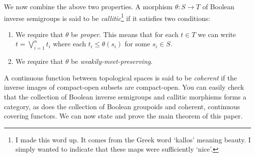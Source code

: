 \documentclass[a4paper]{amsart}
\begin{document}
We now combine the above two properties.
A morphism $\theta \colon S \rightarrow T$ of Boolean inverse semigroups is said to be {\em callitic}\footnote{I made this word up. It comes from the Greek word `kallos' meaning beauty.
I simply wanted to indicate that these maps were sufficiently `nice'.} 
if it satisfies two conditions:
\begin{enumerate}
\item We require that $\theta$ be {\em proper}. This means that for each $t \in T$ we can write $t = \bigvee_{i=1}^{n} t_{i}$
where each $t_{i} \leq \theta (s_{i})$ for some $s_{i} \in S$.
\item We require that $\theta$ be {\em weakily-meet-preserving}.
\end{enumerate}
A continuous function between topological spaces is said to be {\em coherent} if the inverse images
of compact-open subsets are compact-open.
You can easily check that the collection of Boolean inverse semigroups and callitic morphisms forms a category, 
as does the collection of Boolean groupoids and coherent, continuous covering functors.
We can now state and prove the main theorem of this paper.
\end{document}
